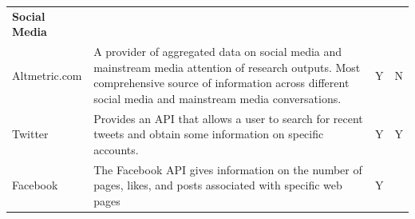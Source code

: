 \documentclass[]{krantz}
\begin{document}
\begin{longtable}[]{@{}llcc@{}}
\begin{minipage}[t]{0.74\columnwidth}
\textbf{Social Media}\strut
\end{minipage} & \begin{minipage}[t]{0.02\columnwidth}\centering\strut
\strut
\end{minipage} & \begin{minipage}[t]{0.02\columnwidth}\centering\strut
\strut
\end{minipage}\tabularnewline
\begin{minipage}[t]{0.10\columnwidth}\raggedright\strut
Altmetric.com\strut
\end{minipage} & \begin{minipage}[t]{0.74\columnwidth}\raggedright\strut
A provider of aggregated data on social media and mainstream media
attention of research outputs. Most comprehensive source of information
across different social media and mainstream media conversations.\strut
\end{minipage} & \begin{minipage}[t]{0.02\columnwidth}\centering\strut
Y\strut
\end{minipage} & \begin{minipage}[t]{0.02\columnwidth}\centering\strut
N\strut
\end{minipage}\tabularnewline
\begin{minipage}[t]{0.10\columnwidth}\raggedright\strut
Twitter\strut
\end{minipage} & \begin{minipage}[t]{0.74\columnwidth}\raggedright\strut
Provides an API that allows a user to search for recent tweets and
obtain some information on specific accounts.\strut
\end{minipage} & \begin{minipage}[t]{0.02\columnwidth}\centering\strut
Y\strut
\end{minipage} & \begin{minipage}[t]{0.02\columnwidth}\centering\strut
Y\strut
\end{minipage}\tabularnewline
\begin{minipage}[t]{0.10\columnwidth}\raggedright\strut
Facebook\strut
\end{minipage} & \begin{minipage}[t]{0.74\columnwidth}\raggedright\strut
The Facebook API gives information on the number of pages, likes, and
posts associated with specific web pages\strut
\end{minipage} & \begin{minipage}[t]{0.02\columnwidth}\centering\strut
Y\strut
\end{minipage} & \begin{minipage}[t]{0.02\columnwidth}\centering\strut

\end{minipage}
\end{longtable}
\end{document}
